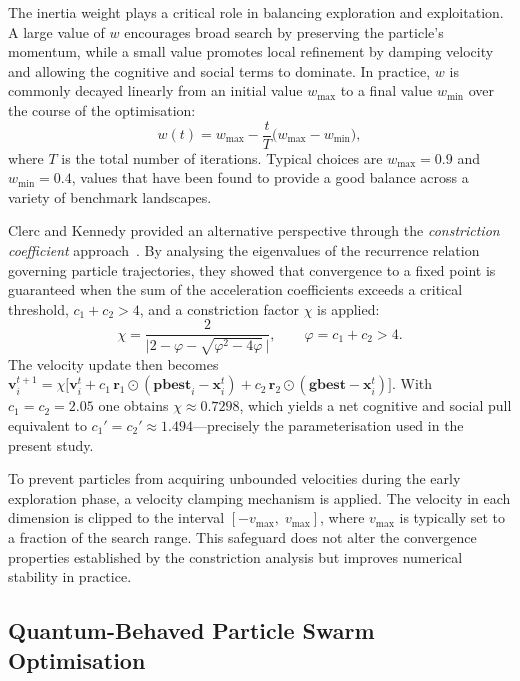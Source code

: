The inertia weight plays a critical role in balancing exploration and
exploitation.  A large value of $w$ encourages broad search by preserving the
particle's momentum, while a small value promotes local refinement by damping
velocity and allowing the cognitive and social terms to dominate.  In practice,
$w$ is commonly decayed linearly from an initial value $w_{\max}$ to a final
value $w_{\min}$ over the course of the optimisation:
\begin{equation}
  w(t) = w_{\max} - \frac{t}{T}\bigl(w_{\max} - w_{\min}\bigr),
  \label{eq:inertia_decay}
\end{equation}
where $T$ is the total number of iterations.  Typical choices are
$w_{\max} = 0.9$ and $w_{\min} = 0.4$, values that have been found to provide
a good balance across a variety of benchmark landscapes.

Clerc and Kennedy provided an alternative perspective through the
\emph{constriction coefficient} approach~\cite{Clerc2002}.  By analysing the
eigenvalues of the recurrence relation governing particle trajectories, they
showed that convergence to a fixed point is guaranteed when the sum of the
acceleration coefficients exceeds a critical threshold, $c_1 + c_2 > 4$, and a
constriction factor $\chi$ is applied:
\begin{equation}
  \chi = \frac{2}{\bigl|2 - \varphi - \sqrt{\varphi^2 - 4\varphi}\,\bigr|},
  \qquad \varphi = c_1 + c_2 > 4.
  \label{eq:constriction}
\end{equation}
The velocity update then becomes
$\mathbf{v}_i^{t+1} = \chi\bigl[\mathbf{v}_i^{t} + c_1\,\mathbf{r}_1 \odot
(\mathbf{pbest}_i - \mathbf{x}_i^{t}) + c_2\,\mathbf{r}_2 \odot
(\mathbf{gbest} - \mathbf{x}_i^{t})\bigr]$.  With $c_1 = c_2 = 2.05$ one
obtains $\chi \approx 0.7298$, which yields a net cognitive and social pull
equivalent to $c_1' = c_2' \approx 1.494$---precisely the parameterisation
used in the present study.

To prevent particles from acquiring unbounded velocities during the early
exploration phase, a velocity clamping mechanism is applied.  The velocity in
each dimension is clipped to the interval $[-v_{\max},\; v_{\max}]$, where
$v_{\max}$ is typically set to a fraction of the search range.  This
safeguard does not alter the convergence properties established by the
constriction analysis but improves numerical stability in practice.


\subsection{Quantum-Behaved Particle Swarm Optimisation}
\label{sec:bg:qpso}

